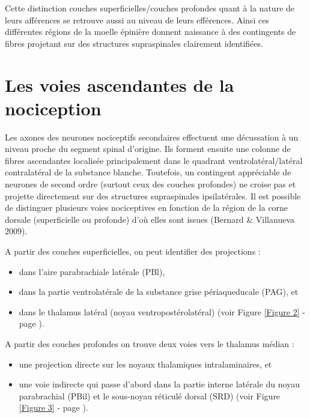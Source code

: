 \documentclass[a4paper,12pt,twoside]{report}
\begin{document}
\bigskip 

Cette distinction couches superficielles/couches profondes quant à la nature de leurs afférences se retrouve aussi au niveau de leurs efférences. Ainsi ces différentes régions de la moelle épinière donnent naissance à des contingents de fibres projetant sur des structures supraspinales clairement identifiées.

\section{Les voies ascendantes de la nociception}

Les axones des neurones nociceptifs secondaires effectuent une décussation à un niveau proche du segment spinal d'origine. Ils forment ensuite une colonne de fibres ascendantes localisée principalement dans le quadrant ventrolatéral/latéral contralatéral de la substance blanche. Toutefois, un contingent appréciable de neurones de second ordre (surtout ceux des couches profondes) ne croise pas et projette directement sur des structures supraspinales ipsilatérales. Il est possible de distinguer plusieurs voies nociceptives en fonction de la région de la corne dorsale (superficielle ou profonde) d’où elles sont issues (Bernard \& Villanueva 2009).

A partir des couches superficielles, on peut identifier des projections :

\begin{itemize}
\item dans l’aire parabrachiale latérale (PBl), 
\item dans la partie ventrolatérale de la substance grise périaqueducale (PAG), et 
\item dans le thalamus latéral (noyau ventropostérolatéral) (voir Figure \ref{Figure 2} - page \pageref{Figure 2}).
\end{itemize}

A partir des couches profondes on trouve deux voies vers le thalamus médian :
 
\begin{itemize}
\item une projection directe sur les noyaux thalamiques intralaminaires, et 
\item une voie indirecte qui passe d’abord dans la partie interne latérale du noyau parabrachial (PBil) et le sous-noyau réticulé dorsal (SRD) (voir Figure \ref{Figure 3} - page \pageref{Figure 3}).
\end{itemize}
\end{document}

